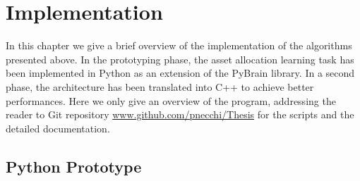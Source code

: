 \chapter{Implementation}

In this chapter we give a brief overview of the implementation of the algorithms presented above. In the prototyping phase, the asset allocation learning task has been implemented in Python as an extension of the PyBrain library. In a second phase, the architecture has been translated into C++ to achieve better performances. Here we only give an overview of the program, addressing the reader to Git repository \url{www.github.com/pnecchi/Thesis} for the scripts and the detailed documentation. 

\section{Python Prototype}
\label{sec:python_prototype}

